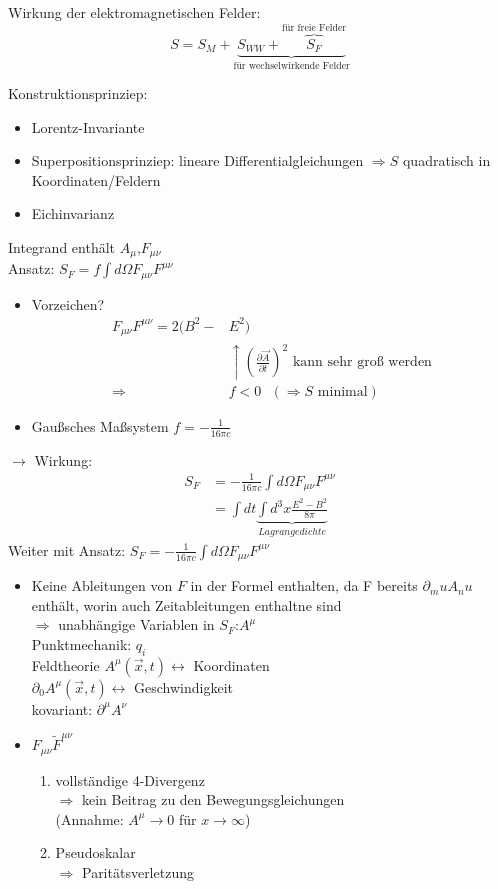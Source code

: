 \documentclass[a4paper]{article}
\begin{document}
Wirkung der elektromagnetischen Felder:
\begin{equation}
S=S_M+\underbrace{S_{WW}+\overbrace{S_F}^{\text{für freie Felder}}}_{\text{für
wechselwirkende Felder}}
\end{equation}

Konstruktionsprinziep:
\begin{itemize}
  \item Lorentz-Invariante
  \item Superpositionsprinziep: lineare Differentialgleichungen $\Rightarrow S$
  quadratisch in Koordinaten/Feldern
  \item Eichinvarianz
\end{itemize}
Integrand enthält $A_\mu$,$F_{\mu\nu}$\\
Ansatz: $S_F=f\int d\Omega F_{\mu\nu}F^{\mu\nu}$\\
\begin{itemize}
  \item Vorzeichen?
	\begin{align}
	F_{\mu\nu}F^{\mu\nu}=2(B^2-&E^2)\\
	&\uparrow \left(\frac{\partial \vec{A}}{\partial t}\right)^2 \text{ kann sehr
	groß werden}\\
	\Rightarrow &f<0 \text{   } (\Rightarrow S \text{ minimal})
	\end{align}
   \item Gaußsches Maßsystem $f=-\frac{1}{16\pi c}$
\end{itemize}
$\rightarrow$ Wirkung:
\begin{align}
S_F&=-\frac{1}{16\pi c}\int d\Omega F_{\mu\nu}F^{\mu\nu}\\
&=\int dt\underbrace{\int d^3x \frac{E^2-B^2}{8\pi}}_{Lagrangedichte}
\end{align}
Weiter mit Ansatz: $S_F=-\frac{1}{16\pi c}\int d\Omega F_{\mu\nu}F^{\mu\nu}$
\begin{itemize}
  \item Keine Ableitungen von $F$ in der Formel enthalten, da F bereits
  $\partial_mu A_nu$ enthält, worin auch Zeitableitungen enthaltne sind
  \\$\Rightarrow$ unabhängige Variablen in $S_F$:$A^\mu$\\
  Punktmechanik: $q_i$\\ Feldtheorie $A^\mu(\vec{x},t) \leftrightarrow $
  Koordinaten \\ $\partial_0 A^\mu(\vec{x},t) \leftrightarrow $
  Geschwindigkeit \\ kovariant: $\partial^\mu A^\nu$
  \item $F_{\mu\nu}\tilde{F}^{\mu\nu}$ 
  	\begin{enumerate}
	  \item vollständige 4-Divergenz \\ $\Rightarrow$ kein Beitrag zu den
	  Bewegungsgleichungen\\ (Annahme: $A^\mu \rightarrow 0$ für
	  $x\rightarrow\infty$)
	  \item Pseudoskalar\\ $\Rightarrow$ Paritätsverletzung
	\end{enumerate}
\end{itemize}
\end{document}
